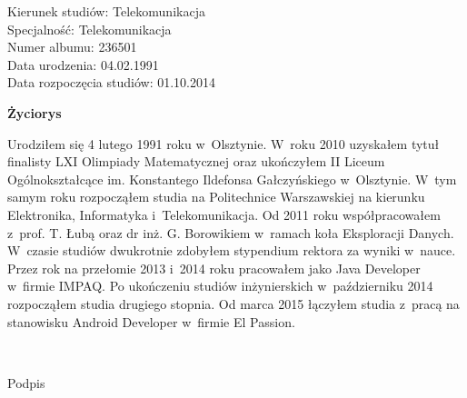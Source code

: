 	\newpage
	\thispagestyle{empty}

\begin{flushright}

  \begin{varwidth}[t]{\textwidth}
	Kierunek studiów: Telekomunikacja\\
	Specjalność: Telekomunikacja \\
	Numer albumu: 236501\\
	Data urodzenia: 04.02.1991 \\
	Data rozpoczęcia studiów: 01.10.2014 \\
  \end{varwidth}

\end{flushright}

\begin{center}
    \textbf{\textbf{Życiorys}}
\end{center}

	\vspace{0.5cm}

Urodziłem się 4 lutego 1991 roku w~Olsztynie.
W~roku 2010 uzyskałem tytuł finalisty LXI Olimpiady Matematycznej oraz
ukończyłem II Liceum Ogólnokształcące im. Konstantego Ildefonsa Gałczyńskiego w~Olsztynie.
W~tym samym roku rozpocząłem studia na Politechnice Warszawskiej na kierunku Elektronika, Informatyka i~Telekomunikacja.
Od 2011 roku współpracowałem z~prof. T. Łubą oraz dr inż. G. Borowikiem w~ramach koła Eksploracji Danych.
W~czasie studiów dwukrotnie zdobyłem stypendium rektora za wyniki w~nauce.
Przez rok na przełomie 2013 i~2014 roku pracowałem jako Java Developer w~firmie IMPAQ.
Po ukończeniu studiów inżynierskich w~październiku 2014 rozpocząłem studia drugiego stopnia.
Od marca 2015 łączyłem studia z~pracą na stanowisku Android Developer w~firmie El Passion.

	\vspace{1cm}

\begin{flushright}
	\begin{minipage}{5cm}
		\dotfill \\[-0.7cm]
		\begin{center}
		\small Podpis
		\end{center}
	\end{minipage}
\end{flushright}

	\vspace{2cm}
